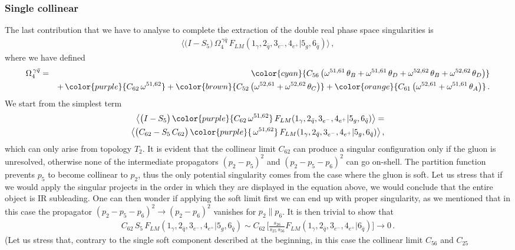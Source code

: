 \documentclass[12pt,a4paper]{article}
\newcommand{\nn}{\nonumber}
\newcommand{\beq}{\begin{eqnarray}}
\newcommand{\eeq}{\end{eqnarray}}
\begin{document}
 \subsubsection{Single collinear}
 The last contribution that we have to analyse to complete the 
 extraction of the double real phase space singularities is
 \beq
\big\langle \big( I -S_{5}\big) \,  \Omega^{\, \gamma \bar{q}}_4 \, 
F_{LM}(1_\gamma,2_{\bar{q}},3_{e^-},4_{e^+} |5_g, 6_{\bar{q}})\big\rangle \, ,
\eeq
where we have defined 
\beq
  \Omega^{\, \gamma\bar{q}}_4
&=&
{\color{cyan}{
C_{56}  \,  \big( 
\omega^{51,61} \, \theta_B 
+ 
\omega^{51,61} \, \theta_D
+ 
 \omega^{52,62} \, \theta_B 
 +
 \omega^{52,62} \, \theta_D
 \big)
 }}
 \nn \\
 &&
 + \, 
{\color{purple}{C_{62}  \, \omega^{51,62} }} 
 +
{\color{brown}{C_{52}  \, \big(  \omega^{52,61} + 
 \omega^{52,62} \, \theta_C   \big)}}
 +
 {\color{orange}{C_{61} \, \big(  \omega^{52,61} +
 \omega^{51,61}  \, \theta_A \big)}}
  \, .
 \eeq
We start from the simplest term
 \beq
\big\langle \big( I -S_{5}\big) \, {\color{purple}{C_{62}  \, \omega^{51,62} }} \,
 F_{LM}(1_\gamma,2_{\bar{q}},3_{e^-},4_{e^+} |5_g, 6_{\bar{q}})\big\rangle 
= 
\nn \\
 \big\langle \big( C_{62}  - S_{5} \, C_{62}  \big) \, {\color{purple}{ \, \omega^{51,62} }} \,
 F_{LM}(1_\gamma,2_{\bar{q}},3_{e^-},4_{e^+} |5_g, 6_{\bar{q}})\big\rangle 
\, ,
\eeq
which can only arise from topology $T_2$.
It is evident that the collinear limit $C_{62}$ can produce
a singular configuration only if the gluon is unresolved,
otherwise none of the intermediate propagators $(p_2-p_5)^2$
and $(p_2-p_5-p_6)^2$ can go on-shell. The partition 
function prevents $p_5$ to become collinear to $p_2$, thus 
the only potential singularity comes from the case where 
the gluon is soft.
Let us stress that if we would apply the singular projects in the 
order in which they are displayed in the equation above, we would 
conclude that the entire object is IR subleading.
One can then wonder if applying the soft limit first we can 
end up with proper singularity, as we mentioned that in this case
the propagator $(p_2-p_5-p_6)^2 \rightarrow (p_2-p_6)^2$ 
vanishes for $p_2 \parallel p_6$.
It is then trivial to show that 
\beq
C_{62} \,  S_{5} \, 
 F_{LM}(1_\gamma,2_{\bar{q}},3_{e^-},4_{e^+} |5_g, 6_{\bar{q}})
 \sim
 C_{62} \, 
 \bigg[
 \frac{s_{26}}{s_{25} \, s_{56}} 
  F_{LM}(1_\gamma,2_{\bar{q}},3_{e^-},4_{e^+} | 6_{\bar{q}})
  \bigg]
  \rightarrow 0 \, .
\eeq
(Let us stress that, contrary to the single soft component described
at the beginning, in this case the collinear limit $C_{56}$ and $C_{25}$
\end{document}
